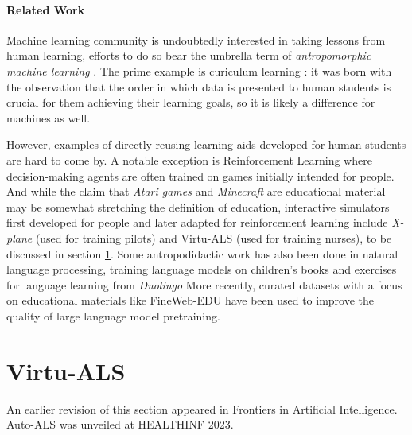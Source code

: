 \paragraph{Related Work}

Machine learning community is undoubtedly interested in taking lessons from human learning, efforts to do so bear the umbrella term of \emph{antropomorphic
machine learning} \cite{angelovAnthropomorphicMachineLearning2018}. The prime example is curiculum learning \cite{sovianyCurriculumLearningSurvey2022,zhouCurBenchCurriculumLearning2024}: it was born with the observation that the order in which data is presented to human students is crucial for them achieving their learning goals, so it is likely a difference for machines as well.

However, examples of directly reusing learning aids developed for human students are hard to come by. A notable exception is Reinforcement Learning where decision-making agents are often trained on games initially intended for people. And while the claim that \emph{Atari games} \cite{mnihPlayingAtariDeep2013} and 
\emph{Minecraft} \cite{hofmannMinecraftAIPlayground2019} are educational material may be somewhat stretching the definition of education, interactive simulators first developed for people and later adapted for reinforcement learning include \emph{X-plane} \cite{staudingerXPlaneMLEnvironmentLearning2018} (used for training pilots) and Virtu-ALS (used for training nurses), to be discussed in section \ref{sec:virtu-als}. 
Some antropodidactic work has also been done in natural language processing, training language models on children's books \cite{mayhewSimultaneousTranslationParaphrase2020} and exercises for language learning from \emph{Duolingo} \cite{mayhewSimultaneousTranslationParaphrase2020}
More recently, curated datasets with a focus on educational materials like FineWeb-EDU \cite{penedoFineWebDatasetsDecanting2024} have been used to improve the quality of large language model pretraining.

\newpage
\section{Virtu-ALS}
\label{sec:virtu-als}

\begin{remark}
  An earlier revision of this section \cite[section 3.1]{liventsevEffectivePatientSimulators2021} appeared in Frontiers in Artificial Intelligence. Auto-ALS \cite{liventsevVadim0x60Autoals2024} was unveiled at HEALTHINF 2023.
\end{remark}


